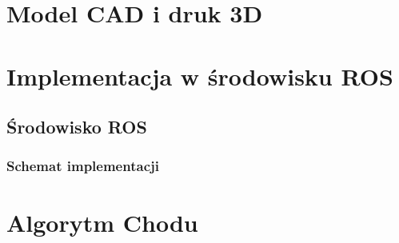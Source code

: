 \documentclass[a4paper,13pt]{article}
\begin{document}
\section{Model CAD i druk 3D}

\section{Implementacja w środowisku ROS}
\subsection{Środowisko ROS}
\subsubsection{Schemat implementacji}

\section{Algorytm Chodu}
\end{document}
